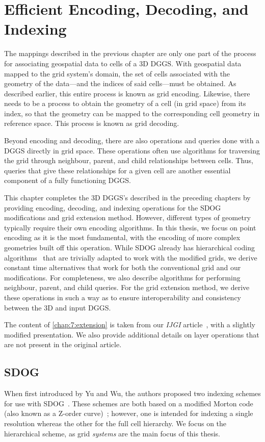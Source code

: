 \chapter{Efficient Encoding, Decoding, and Indexing} \label{chap:coding}
The mappings described in the previous chapter are only one part of the process for associating geospatial data to cells of a 3D DGGS.
With geospatial data mapped to the grid system's domain, the set of cells associated with the geometry of the data---and the indices of said cells---must be obtained.
As described earlier, this entire process is known as grid encoding.
Likewise, there needs to be a process to obtain the geometry of a cell (in grid space) from its index, so that the geometry can be mapped to the corresponding cell geometry in reference space.
This process is known as grid decoding.


Beyond encoding and decoding, there are also operations and queries done with a DGGS directly in grid space.
These operations often use algorithms for traversing the grid through neighbour, parent, and child relationships between cells.
Thus, queries that give these relationships for a given cell are another essential component of a fully functioning DGGS.


This chapter completes the 3D DGGS's described in the preceding chapters by providing encoding, decoding, and indexing operations for the SDOG modifications and grid extension method.
However, different types of geometry typically require their own encoding algorithms.
In this thesis, we focus on point encoding as it is the most fundamental, with the encoding of more complex geometries built off this operation.
While SDOG already has hierarchical coding algorithms~\cite{yu2009sdog, yu2009coding} that are trivially adapted to work with the modified grids, we derive constant time alternatives that work for both the conventional grid and our modifications.
For completeness, we also describe algorithms for performing neighbour, parent, and child queries.
For the grid extension method, we derive these operations in such a way as to ensure interoperability and consistency between the 3D and input DGGS.


The content of \cref{chap:7:extension} is taken from our \textit{IJGI} article~\cite{ulmer2020general}, with a slightly modified presentation.
We also provide additional details on layer operations that are not present in the original article.


\section{SDOG}
When first introduced by Yu and Wu, the authors proposed two indexing schemes for use with SDOG~\cite{yu2009coding}.
These schemes are both based on a modified Morton code (also known as a Z-order curve)~\cite{morton1966computer}; however, one is intended for indexing a single resolution whereas the other for the full cell hierarchy.
We focus on the hierarchical scheme, as grid \textit{systems} are the main focus of this thesis.



